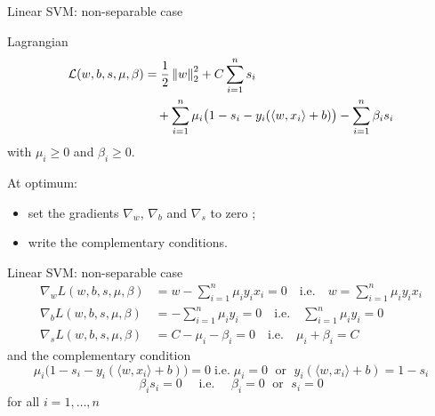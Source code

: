 \documentclass[xcolor={usenames,dvipsnames}]{beamer}
\begin{document}
\begin{frame}{Linear SVM: non-separable case}
  \begin{block}{Lagrangian}
  \begin{align*}
    \mathcal{L}(w, b, s, \mu, \beta) &= \frac 12 \left\| w \right\|_2^2 + C \sum_{i=1}^n 
    s_i \\ 
    & \quad + \sum_{i=1}^n \mu_i \big(1 - s_i - y_i( \langle {w, x_i} \rangle  + b) \big) 
    - \sum_{i=1}^n \beta_i s_i
  \end{align*}
  with $\mu_i\geq 0$ and $\beta_i \geq 0$.
  \end{block}
  
  At optimum:
  \begin{itemize}
    \item set the \alert{gradients} $\nabla_w$, $\nabla_b$ and $\nabla_s$ \alert{to zero} ;
    \item write \alert{the complementary conditions}.
  \end{itemize}
\end{frame}


\begin{frame}{Linear SVM: non-separable case}
    \begin{align*}
      \nabla_w L(w, b, s, \mu, \beta) &= w - \sum_{i=1}^n \mu_i y_i x_i = 0 \quad \text{i.e.} \quad w = \sum_{i=1}^n \mu_i y_i x_i \\
      \nabla_b L(w, b, s, \mu, \beta) &= -\sum_{i=1}^n \mu_i y_i = 0 \quad \text{i.e.} \quad \sum_{i=1}^n \mu_i y_i = 0 \\
      \nabla_s L(w, b, s, \mu, \beta) &= C - \mu_i - \beta_i = 0 \quad \text{i.e.} \quad \mu_i + \beta_i = C
    \end{align*}
    and the complementary condition
    \begin{equation*}
      \mu_i \big(1 - s_i - y_i(\langle {w, x_i} \rangle  + b) \big) = 0 \; \text{i.e.} \; \mu_i = 0 \; \text{ or } \; y_i(\langle {w, x_i} \rangle + b) = 1 - s_i
    \end{equation*}
    \begin{equation*}
      \beta_i s_i = 0 \quad \text{ i.e. } \quad \beta_i = 0 \; \text{ or } \; s_i = 0
    \end{equation*}
    for all $i=1, \ldots, n$
\end{frame}
\end{document}
